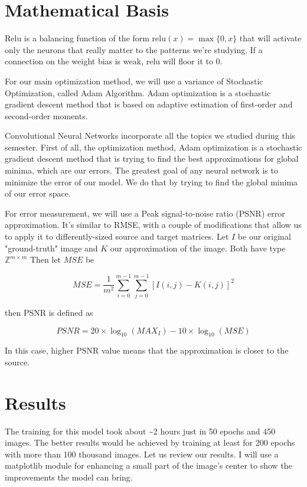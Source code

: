 \documentclass[12pt]{article}
\def\Z{\mathbb Z}
\begin{document}
\section*{Mathematical Basis}
\label{sec:orgff29600}
Relu is a balancing function of the form \(\text{relu}(x) = \max\{0, x\}\) that will
activate only the neurons that really matter to the patterns we're studying. If a
connection on the weight bias is weak, relu will floor it to 0.

For our main optimization method, we will use a variance of Stochastic Optimization,
called Adam Algorithm. Adam optimization is a stochastic gradient descent method that
is based on adaptive estimation of first-order and second-order moments.

Convolutional Neural Networks incorporate all the topics we studied during this
semester. First of all, the optimization method, Adam optimization is a stochastic
gradient descent method that is trying to find the best approximations for global
minima, which are our errors. The greatest goal of any neural network is to minimize
the error of our model. We do that by trying to find the global minima of our error
space.

For error measurement, we will use a Peak signal-to-noise ratio (PSNR) error
approximation. It's similar to RMSE, with a couple of modifications that allow us
to apply it to differently-sized source and target matrices. Let \(I\) be our original
"ground-truth" image and \(K\) our approximation of the image.
Both have type \(\Z^{m \times m}\)
Then let \(MSE\) be

\begin{equation}
	MSE = \frac{1}{m^2} \sum_{i=0}^{m-1} \sum_{j=0}^{m-1} [I(i,j)-K(i,j)]^2
\end{equation}

then PSNR is defined as

\begin{equation}
	PSNR = 20 \times \log_{10}(MAX_I) - 10 \times \log_{10}(MSE)
\end{equation}

In this case, higher PSNR value means that the approximation is closer to the source.

\section*{Results}
\label{sec:orgeedd8d2}
\enlargethispage{\baselineskip}
The training for this model took about \textasciitilde{}2 hours just in 50 epochs and 450 images. The
better results would be achieved by training at least for 200 epochs with more than 100
thousand images. Let us review our results. I will use a matplotlib module for
enhancing a small part of the image's center to show the improvements the model can
bring.
\end{document}
